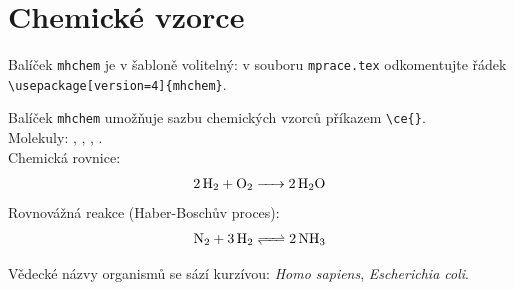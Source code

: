 
\section{Chemické vzorce}

Balíček \texttt{mhchem} je v šabloně volitelný: v souboru \texttt{mprace.tex}
odkomentujte řádek \verb|\usepackage[version=4]{mhchem}|.

Balíček \texttt{mhchem} umožňuje sazbu chemických vzorců příkazem \verb|\ce{}|.\\
Molekuly: , , , .\\
Chemická rovnice:
$$\ce{2H2 + O2 -> 2H2O}$$
Rovnovážná reakce (Haber-Boschův proces):
$$\ce{N2 + 3H2 <=> 2NH3}$$

Vědecké názvy organismů se sází kurzívou: \textit{Homo sapiens}, \textit{Escherichia coli}.
